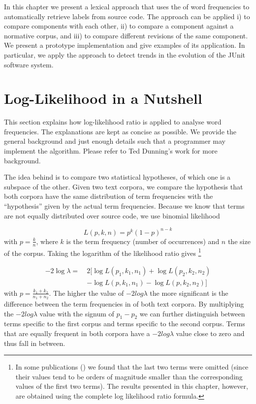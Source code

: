 In this chapter we present a lexical approach that uses the \loglr of word frequencies to automatically retrieve labels from source code. The approach can be applied i) to compare components with each other, ii) to compare a component against a normative corpus, and iii) to compare different revisions of the same component. We present a prototype implementation and give examples of its application. In particular, we apply the approach to detect trends in the evolution of the JUnit software system.

\section{Log-Likelihood in a Nutshell}\label{nutshell}

This section explains how log-likelihood ratio is applied to analyse word frequencies. The explanations are kept as concise as possible. We provide the general background and just enough details such that a programmer may implement the algorithm. Please refer to Ted Dunning's work \cite{Dunning} for more background.

The idea behind \loglr is to compare two statistical hypotheses, of which one is a subspace of the other. Given two text corpora, we compare the hypothesis that both corpora have the same distribution of term frequencies with the ``hypothesis'' given by the actual term frequencies. Because we know that terms are not equally distributed over source code, we use binomial likelihood

$$ L(p,k,n) = p^k ( 1 - p) ^ { n - k }$$
\noindent
with $p = \frac{k}{n}$, where $k$ is the term frequency (\ie number of occurrences) and $n$ the size of the corpus. Taking the logarithm of the likelihood ratio gives
\footnote{In some publications (\eg \cite{Rayson}) we found that the last two terms were omitted (since their values tend to be orders of magnitude smaller than the corresponding values of the first two terms). The results presented in this chapter, however, are obtained using the complete log likelihood ratio formula.}

\begin{align*}
-2 \log \lambda =~&2 \big[ \log L(p_1,k_1,n_1) + \log L(p_2,k_2,n_2)\\
 &- \log L(p,k_1,n_1) - \log L(p,k_2,n_2) \big] 
\end{align*}
\noindent
with $p = \frac{k_1 + k_2}{n_1 + n_2}$. The higher the value of $-2log\lambda$ the more significant is the difference between the term frequencies in of both text corpora. By multiplying the $-2log\lambda$ value with the signum of $p_1 - p_2$ we can further distinguish between terms specific to the first corpus and terms specific to the second corpus. Terms that are equally frequent in both corpora have a $-2log\lambda$ value close to zero and thus fall in between.

